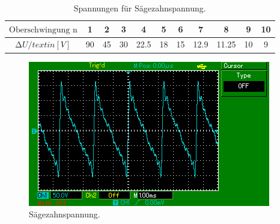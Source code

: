 \begin{table}[h]
  \centering
  \label{tab:6}
  \begin{tabular}{ c c c c c c c c c c c }
    \toprule
   $ \text{Oberschwingung n} $ & 1 &2 &  3 & 4& 5 &6& 7&8 & 9 & 10\\
    \midrule
   $\increment{U} /text{in[V]}$ &90& 45 & 30 & 22.5 &18 & 15 & 12.9 & 11.25 & 10 & 9 \\
    \bottomrule
  \end{tabular}
  \caption{Spannungen für Sägezahnspannung.}
\end{table}
\begin{figure}[H]
  \centering
  \includegraphics{content/images/saegezahn.png}
  \caption{Sägezahnspannung.}
  \label{fig:saeg}
\end{figure}
